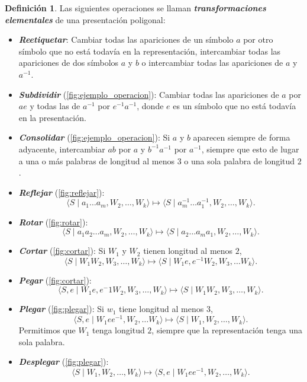 \documentclass[10pt]{report}
\newcommand{\enfatiza}[1]{\textbf{\textit{#1}}}
\theoremstyle{definition}
\newtheorem{defin}{Definición}[section]
\begin{document}
\begin{defin}%
Las siguientes operaciones se llaman \enfatiza{transformaciones elementales} de una presentación poligonal:
\begin{itemize}
\item \enfatiza{Reetiquetar}: Cambiar todas las apariciones de un símbolo $a$ por otro símbolo que no está todavía en la representación, intercambiar todas las apariciones de dos símbolos $a$ y $b$ o intercambiar todas las apariciones de $a$ y $a^{-1}$.
\item \enfatiza{Subdividir} (\autoref{fig:ejemplo_operacion}): Cambiar todas las apariciones de $a$ por $ae$ y todas las de $a^{-1}$ por $e^{-1}a^{-1}$, donde $e$ es un símbolo que no está todavía en la presentación.
\item \enfatiza{Consolidar} (\autoref{fig:ejemplo_operacion}): Si $a$ y $b$ aparecen siempre de forma adyacente, intercambiar $ab$ por $a$ y $b^{-1}a^{-1}$ por $a^{-1}$, siempre que esto de lugar a una o más palabras de longitud al menos $3$ o una sola palabra de longitud $2$.
\item \enfatiza{Reflejar} (\autoref{fig:reflejar}): $$\langle S\mid   a_1 \dots a_m, W_2,\dots,W_k\rangle \mapsto \langle S\mid   a_m^{-1}\dots a_1^{-1}, W_2, \dots ,W_k\rangle .$$
\item \enfatiza{Rotar} (\autoref{fig:rotar}): $$\langle S\mid a_1a_2\dots a_m, W_2,\dots , W_k\rangle \mapsto \langle S\mid   a_2\dots a_ma_1, W_2,\dots , W_k\rangle .$$
\item \enfatiza{Cortar} (\autoref{fig:cortar}): Si $W_1$ y $W_2$ tienen longitud al menos $2$, $$\langle S\mid W_1W_2, W_3,\dots , W_k\rangle \mapsto \langle S\mid W_1e, e^{-1}W_2, W_3,\dots W_k\rangle .$$ 
\item \enfatiza{Pegar} (\autoref{fig:cortar}): $$\langle S,e\mid W_1e, e^-1W_2, W_3,\dots , W_k\rangle \mapsto \langle S\mid W_1W_2, W_3,\dots , W_k\rangle .$$
\item \enfatiza{Plegar} (\autoref{fig:plegar}): Si $w_1$ tiene longitud al menos $3$, $$\langle S,e\mid W_1ee^{-1}, W_2,\dots W_k\rangle \mapsto \langle S\mid W_1, W_2,\dots , W_k\rangle .$$ Permitimos que $W_1$ tenga longitud $2$, siempre que la representación tenga una sola palabra.
\item \enfatiza{Desplegar} (\autoref{fig:plegar}): $$\langle S\mid W_1, W_2,\dots , W_k\rangle \mapsto \langle S,e\mid W_1ee^{-1}, W_2,\dots , W_k\rangle .$$
\end{itemize}
\end{defin}
\end{document}
